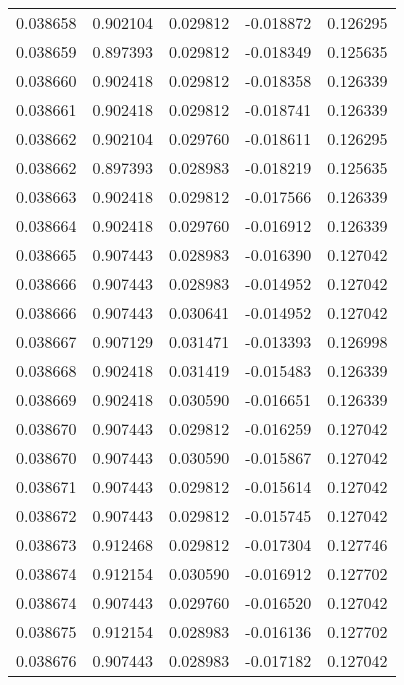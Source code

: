 \begin{tabular}{lrrrr}
0.038658    &  0.902104 &  0.029812 & -0.018872 &             0.126295 \\
0.038659    &  0.897393 &  0.029812 & -0.018349 &             0.125635 \\
0.038660    &  0.902418 &  0.029812 & -0.018358 &             0.126339 \\
0.038661    &  0.902418 &  0.029812 & -0.018741 &             0.126339 \\
0.038662    &  0.902104 &  0.029760 & -0.018611 &             0.126295 \\
0.038662    &  0.897393 &  0.028983 & -0.018219 &             0.125635 \\
0.038663    &  0.902418 &  0.029812 & -0.017566 &             0.126339 \\
0.038664    &  0.902418 &  0.029760 & -0.016912 &             0.126339 \\
0.038665    &  0.907443 &  0.028983 & -0.016390 &             0.127042 \\
0.038666    &  0.907443 &  0.028983 & -0.014952 &             0.127042 \\
0.038666    &  0.907443 &  0.030641 & -0.014952 &             0.127042 \\
0.038667    &  0.907129 &  0.031471 & -0.013393 &             0.126998 \\
0.038668    &  0.902418 &  0.031419 & -0.015483 &             0.126339 \\
0.038669    &  0.902418 &  0.030590 & -0.016651 &             0.126339 \\
0.038670    &  0.907443 &  0.029812 & -0.016259 &             0.127042 \\
0.038670    &  0.907443 &  0.030590 & -0.015867 &             0.127042 \\
0.038671    &  0.907443 &  0.029812 & -0.015614 &             0.127042 \\
0.038672    &  0.907443 &  0.029812 & -0.015745 &             0.127042 \\
0.038673    &  0.912468 &  0.029812 & -0.017304 &             0.127746 \\
0.038674    &  0.912154 &  0.030590 & -0.016912 &             0.127702 \\
0.038674    &  0.907443 &  0.029760 & -0.016520 &             0.127042 \\
0.038675    &  0.912154 &  0.028983 & -0.016136 &             0.127702 \\
0.038676    &  0.907443 &  0.028983 & -0.017182 &             0.127042 \\

\end{tabular}
